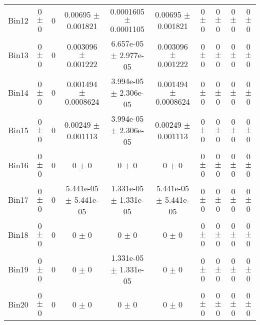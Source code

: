 \begin{tabular}{@{\extracolsep{4pt}}lccccccccc@{}}
     Bin12 & 0 $\pm$ 0 & 0 & 0.00695 $\pm$ 0.001821 & 0.0001605 $\pm$ 0.0001105 & 0.00695 $\pm$ 0.001821 & 0 $\pm$ 0 & 0 $\pm$ 0 & 0 $\pm$ 0 & 0 $\pm$ 0 \\ 
     Bin13 & 0 $\pm$ 0 & 0 & 0.003096 $\pm$ 0.001222 & 6.657e-05 $\pm$ 2.977e-05 & 0.003096 $\pm$ 0.001222 & 0 $\pm$ 0 & 0 $\pm$ 0 & 0 $\pm$ 0 & 0 $\pm$ 0 \\ 
     Bin14 & 0 $\pm$ 0 & 0 & 0.001494 $\pm$ 0.0008624 & 3.994e-05 $\pm$ 2.306e-05 & 0.001494 $\pm$ 0.0008624 & 0 $\pm$ 0 & 0 $\pm$ 0 & 0 $\pm$ 0 & 0 $\pm$ 0 \\ 
     Bin15 & 0 $\pm$ 0 & 0 & 0.00249 $\pm$ 0.001113 & 3.994e-05 $\pm$ 2.306e-05 & 0.00249 $\pm$ 0.001113 & 0 $\pm$ 0 & 0 $\pm$ 0 & 0 $\pm$ 0 & 0 $\pm$ 0 \\ 
     Bin16 & 0 $\pm$ 0 & 0 & 0 $\pm$ 0 & 0 $\pm$ 0 & 0 $\pm$ 0 & 0 $\pm$ 0 & 0 $\pm$ 0 & 0 $\pm$ 0 & 0 $\pm$ 0 \\ 
     Bin17 & 0 $\pm$ 0 & 0 & 5.441e-05 $\pm$ 5.441e-05 & 1.331e-05 $\pm$ 1.331e-05 & 5.441e-05 $\pm$ 5.441e-05 & 0 $\pm$ 0 & 0 $\pm$ 0 & 0 $\pm$ 0 & 0 $\pm$ 0 \\ 
     Bin18 & 0 $\pm$ 0 & 0 & 0 $\pm$ 0 & 0 $\pm$ 0 & 0 $\pm$ 0 & 0 $\pm$ 0 & 0 $\pm$ 0 & 0 $\pm$ 0 & 0 $\pm$ 0 \\ 
     Bin19 & 0 $\pm$ 0 & 0 & 0 $\pm$ 0 & 1.331e-05 $\pm$ 1.331e-05 & 0 $\pm$ 0 & 0 $\pm$ 0 & 0 $\pm$ 0 & 0 $\pm$ 0 & 0 $\pm$ 0 \\ 
     Bin20 & 0 $\pm$ 0 & 0 & 0 $\pm$ 0 & 0 $\pm$ 0 & 0 $\pm$ 0 & 0 $\pm$ 0 & 0 $\pm$ 0 & 0 $\pm$ 0 & 0 $\pm$ 0 \\ 
\hline\hline
  \end{tabular}
